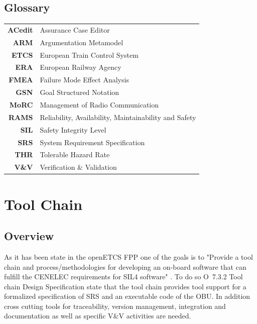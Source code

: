 \documentclass{template/openetcs_report}
\begin{document}

\section{Glossary}
\label{sec:glossary}



\begin{tabular}{rl}
\textbf{ACedit} & Assurance Case Editor \\ 
\textbf{ARM} & Argumentation  Metamodel \\ 
\textbf{ETCS} & European Train Control System \\ \textbf{ERA} & European Railway Agency \\ \textbf{FMEA} & Failure Mode Effect Analysis \\ 
\textbf{GSN} & Goal Structured Notation \\ 
\textbf{MoRC} & Management of Radio Communication \\ 
\textbf{RAMS} & Reliability, Availability, Maintainability and Safety \\
\textbf{SIL} & Safety Integrity Level \\ 
\textbf{SRS} & System Requirement Specification \\ 
\textbf{THR} & Tolerable Hazard Rate \\ 
\textbf{V\&V} & Verification \& Validation \\ 
\end{tabular} 






\chapter{Tool Chain}
\label{toolchain}
\section{Overview}

As it has been state in the openETCS FPP one of the goals  is to "Provide a tool chain and process/methodologies for developing an on-board software that can fulfill the CENELEC requirements for SIL4 software" \cite{FPP}. To do so O~7.3.2 Tool chain Design Specification state that the tool chain  provides tool support for a formalized specification of SRS and an executable code of the OBU. In addition cross cutting tools for traceability, version management, integration and documentation as well as specific V\&V activities are needed.
\end{document}
